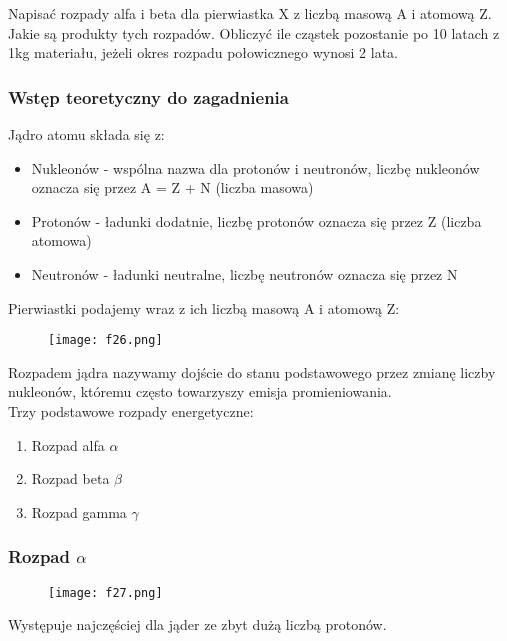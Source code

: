 \documentclass[a4paper,15pt]{article}
\newcommand{\issue}[2]{
    \begin{tcolorbox}[colback=issueColor!5!white,colframe=issueColor,title={Zagadnienie #1}]
        #2
    \end{tcolorbox}
}
\begin{document}
\newpage
\issue{}{
Napisać rozpady alfa i beta dla pierwiastka X z liczbą masową A i atomową Z. Jakie są produkty tych rozpadów. Obliczyć ile cząstek pozostanie po 10 latach z 1kg materiału, jeżeli okres rozpadu połowicznego wynosi 2 lata.
}

\subsubsection{Wstęp teoretyczny do zagadnienia}

Jądro atomu składa się z:
\begin{itemize}
\item Nukleonów - wspólna nazwa dla protonów i neutronów, liczbę nukleonów oznacza się przez A = Z + N (liczba masowa)
\item Protonów - ładunki dodatnie, liczbę protonów oznacza się przez Z (liczba atomowa)
\item Neutronów - ładunki neutralne, liczbę neutronów oznacza się przez N 
\end{itemize}

Pierwiastki podajemy wraz z ich liczbą masową A i atomową Z:

\begin{figure}[H]
\centerline{\texttt{[image: f26.png]}}
\end{figure}

Rozpadem jądra nazywamy dojście do stanu podstawowego przez zmianę liczby nukleonów, któremu często towarzyszy emisja promieniowania.  \\

Trzy podstawowe rozpady energetyczne:

\begin{enumerate}
\item Rozpad alfa $\alpha$
\item Rozpad beta $\beta$
\item Rozpad gamma $\gamma$
\end{enumerate}

\subsubsection{Rozpad $\alpha$}


\begin{figure}[H]
\centerline{\texttt{[image: f27.png]}}
\end{figure}
Występuje najczęściej dla jąder ze zbyt dużą liczbą protonów. \\
\end{document}
